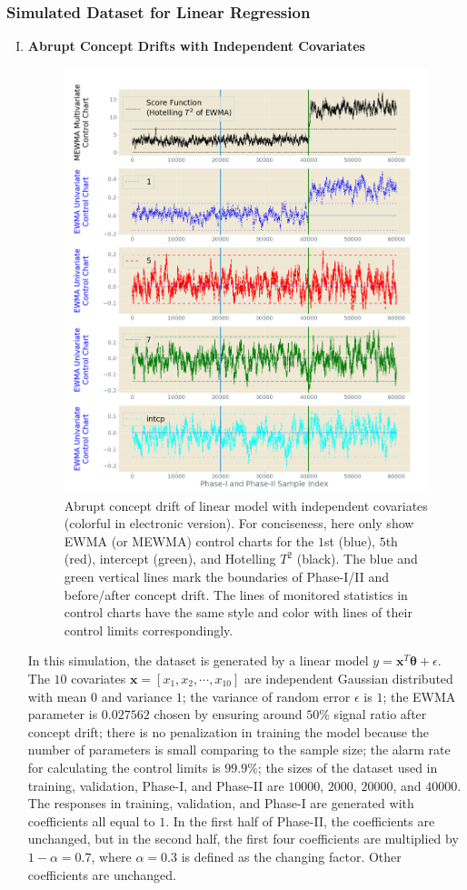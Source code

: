 \documentclass[twoside,11pt]{article}
\begin{document}
\subsubsection{Simulated Dataset for Linear Regression}
\begin{enumerate}[(I)]
\item
\textbf{Abrupt Concept Drifts with Independent Covariates}

\label{sss:lin_ind_pred}
\begin{figure}[!hpt]
\centering
  \includegraphics[width = 0.6\linewidth]{../figures/v14/sim_2/reg/neg_single_3_sim2_mlines_with_regu_1e-08_0_005.png}
  \caption{Abrupt concept drift of linear model with independent covariates (colorful in electronic version). For conciseness, here only show EWMA (or MEWMA) control charts for the $1$st (blue), $5$th (red), intercept (green), and Hotelling $T^2$ (black). The blue and green vertical lines mark the boundaries of Phase-I/II and before/after concept drift. The lines of monitored statistics in control charts have the same style and color with lines of their control limits correspondingly.}
  \label{fig:lin_reg_ind_X}
\end{figure}
In this simulation, the dataset is generated by a {linear} model $y = \bm {x}^T\bm { \theta} + \epsilon$. The $10$ {covariates} {$\bm {x}=[x_1, x_2, \cdots, x _{10}]$} are independent Gaussian distributed with mean $0$ and variance $1$; the variance of random error $ \epsilon$ is $1$; the EWMA parameter is $0.027562$ chosen by ensuring around $50\%$ signal ratio after concept drift; there is no penalization in training the model because the number of parameters is small comparing to the sample size; the alarm rate for calculating the control limits is $99.9\%$; the sizes of the dataset used in training, validation, Phase-I, and Phase-II are $10000$, $2000$, $20000$, and $40000$. The responses in training, validation, and Phase-I are generated with coefficients all equal to $1$. In the first half of Phase-II, the coefficients are unchanged, but in the second half, the first four coefficients are multiplied by $1- \alpha=0.7$, where $ \alpha=0.3$ is defined as the changing factor. Other coefficients are unchanged.

\end{enumerate}
\end{document}
